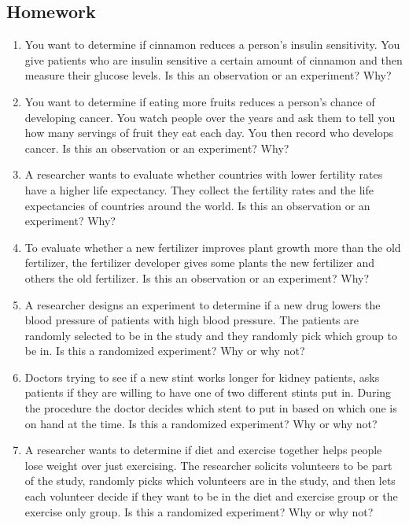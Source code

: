 \documentclass[]{book}
\begin{document}
\hypertarget{homework-2}{%
\subsection{Homework}\label{homework-2}}

\begin{enumerate}
\def\labelenumi{\arabic{enumi}.}
\item
  You want to determine if cinnamon reduces a person's insulin sensitivity. You give patients who are insulin sensitive a certain amount of cinnamon and then measure their glucose levels. Is this an observation or an experiment? Why?
\item
  You want to determine if eating more fruits reduces a person's chance of developing cancer. You watch people over the years and ask them to tell you how many servings of fruit they eat each day. You then record who develops cancer. Is this an observation or an experiment? Why?
\item
  A researcher wants to evaluate whether countries with lower fertility rates have a higher life expectancy. They collect the fertility rates and the life expectancies of countries around the world. Is this an observation or an experiment? Why?
\item
  To evaluate whether a new fertilizer improves plant growth more than the old fertilizer, the fertilizer developer gives some plants the new fertilizer and others the old fertilizer. Is this an observation or an experiment? Why?
\item
  A researcher designs an experiment to determine if a new drug lowers the blood pressure of patients with high blood pressure. The patients are randomly selected to be in the study and they randomly pick which group to be in. Is this a randomized experiment? Why or why not?
\item
  Doctors trying to see if a new stint works longer for kidney patients, asks patients if they are willing to have one of two different stints put in. During the procedure the doctor decides which stent to put in based on which one is on hand at the time. Is this a randomized experiment? Why or why not?
\item
  A researcher wants to determine if diet and exercise together helps people lose weight over just exercising. The researcher solicits volunteers to be part of the study, randomly picks which volunteers are in the study, and then lets each volunteer decide if they want to be in the diet and exercise group or the exercise only group. Is this a randomized experiment? Why or why not?

\end{enumerate}
\end{document}
